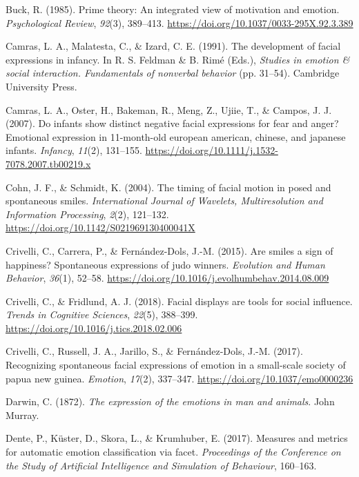 \documentclass[
  english,
  doc]{apa7}
\newlength{\cslhangindent}
\newenvironment{cslreferences}%
  {\setlength{\parindent}{0pt}%
  \everypar{\setlength{\hangindent}{\cslhangindent}}\ignorespaces}%
  {\par}
\begin{document}
\begin{cslreferences}
\leavevmode\hypertarget{ref-buck1985prime}{}%
Buck, R. (1985). Prime theory: An integrated view of motivation and emotion. \emph{Psychological Review}, \emph{92}(3), 389--413. \url{https://doi.org/10.1037/0033-295X.92.3.389}

\leavevmode\hypertarget{ref-camras1991development}{}%
Camras, L. A., Malatesta, C., \& Izard, C. E. (1991). The development of facial expressions in infancy. In R. S. Feldman \& B. Rimé (Eds.), \emph{Studies in emotion \& social interaction. Fundamentals of nonverbal behavior} (pp. 31--54). Cambridge University Press.

\leavevmode\hypertarget{ref-camras2007infants}{}%
Camras, L. A., Oster, H., Bakeman, R., Meng, Z., Ujiie, T., \& Campos, J. J. (2007). Do infants show distinct negative facial expressions for fear and anger? Emotional expression in 11-month-old european american, chinese, and japanese infants. \emph{Infancy}, \emph{11}(2), 131--155. \url{https://doi.org/10.1111/j.1532-7078.2007.tb00219.x}

\leavevmode\hypertarget{ref-cohn2003timing}{}%
Cohn, J. F., \& Schmidt, K. (2004). The timing of facial motion in posed and spontaneous smiles. \emph{International Journal of Wavelets, Multiresolution and Information Processing}, \emph{2}(2), 121--132. \url{https://doi.org/10.1142/S021969130400041X}

\leavevmode\hypertarget{ref-crivelli2015smiles}{}%
Crivelli, C., Carrera, P., \& Fernández-Dols, J.-M. (2015). Are smiles a sign of happiness? Spontaneous expressions of judo winners. \emph{Evolution and Human Behavior}, \emph{36}(1), 52--58. \url{https://doi.org/10.1016/j.evolhumbehav.2014.08.009}

\leavevmode\hypertarget{ref-crivelli2018facial}{}%
Crivelli, C., \& Fridlund, A. J. (2018). Facial displays are tools for social influence. \emph{Trends in Cognitive Sciences}, \emph{22}(5), 388--399. \url{https://doi.org/10.1016/j.tics.2018.02.006}

\leavevmode\hypertarget{ref-crivelli2017recognizing}{}%
Crivelli, C., Russell, J. A., Jarillo, S., \& Fernández-Dols, J.-M. (2017). Recognizing spontaneous facial expressions of emotion in a small-scale society of papua new guinea. \emph{Emotion}, \emph{17}(2), 337--347. \url{https://doi.org/10.1037/emo0000236}

\leavevmode\hypertarget{ref-darwin1872expression}{}%
Darwin, C. (1872). \emph{The expression of the emotions in man and animals}. John Murray.

\leavevmode\hypertarget{ref-dente2017measures}{}%
Dente, P., Küster, D., Skora, L., \& Krumhuber, E. (2017). Measures and metrics for automatic emotion classification via facet. \emph{Proceedings of the Conference on the Study of Artificial Intelligence and Simulation of Behaviour}, 160--163.


\end{cslreferences}
\end{document}
